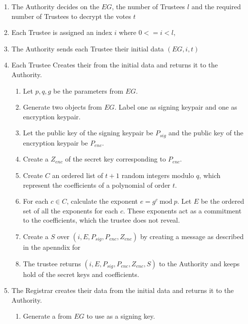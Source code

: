 \begin{enumerate}
    \item The Authority decides on the  $EG$, the number of Trustees $l$ and the required number of Trustees to decrypt the votes $t$
    \item Each Trustee is assigned an index $i$ where $0 <= i < l$,
    \item The Authority sends each Trustee their initial data $(EG, i, t)$
    \item Each Trustee Creates their  from the initial data and returns it to the Authority.
          \begin{enumerate}
              \item Let $p,q,g$ be the parameters from $EG$.
              \item Generate two  objects from $EG$. Label one as signing keypair and one as encryption keypair.
              \item Let the public key of the signing keypair be $P_{sig}$ and the public key of the encryption keypair be $P_{enc}$.
              \item Create a  $Z_{enc}$ of the secret key corresponding to $P_{enc}$.
              \item Create $C$ an ordered list of $t + 1$ random integers modulo $q$, which represent the coefficients of a polynomial of order $t$.
              \item For each $c \in C$, calculate the exponent $e = g^c\ \textrm{mod}\ p$. Let $E$ be the ordered set of all the exponents for each $c$. These exponents act as a commitment to the coefficients, which the trustee does not reveal.
              \item Create a  $S$ over $(i, E, P_{sig}, P_{enc}, Z_{enc})$ by creating a message as described in the apenndix for 
              \item The trustee returns $(i, E, P_{sig}, P_{enc}, Z_{enc}, S)$ to the Authority and keeps hold of the secret keys and coefficients.
          \end{enumerate}
    \item The Registrar creates their  data from the initial data and returns it to the Authority.
          \begin{enumerate}
              \item Generate a  from $EG$ to use as a signing key.

\end{enumerate}
\end{enumerate}
